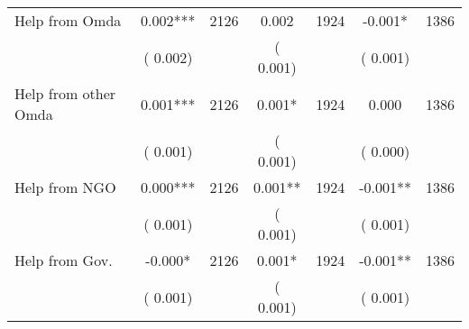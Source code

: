 \begin{tabular}{l*{6}{c}}
Help from Omda        &              0.002***      &       2126       &              0.002      &       1924       &             -0.001*      &       1386       \\
                       &       (       0.002)            &                               &       (       0.001)            &                               &       (       0.001)            &                               \\
Help from other Omda        &              0.001***      &       2126       &              0.001*      &       1924       &              0.000      &       1386       \\
                       &       (       0.001)            &                               &       (       0.001)            &                               &       (       0.000)            &                               \\
Help from NGO        &              0.000***      &       2126       &              0.001**      &       1924       &             -0.001**      &       1386       \\
                       &       (       0.001)            &                               &       (       0.001)            &                               &       (       0.001)            &                               \\
Help from Gov.        &             -0.000*      &       2126       &              0.001*      &       1924       &             -0.001**      &       1386       \\
                       &       (       0.001)            &                               &       (       0.001)            &                               &       (       0.001)            &                               \\
\hline \end{tabular}